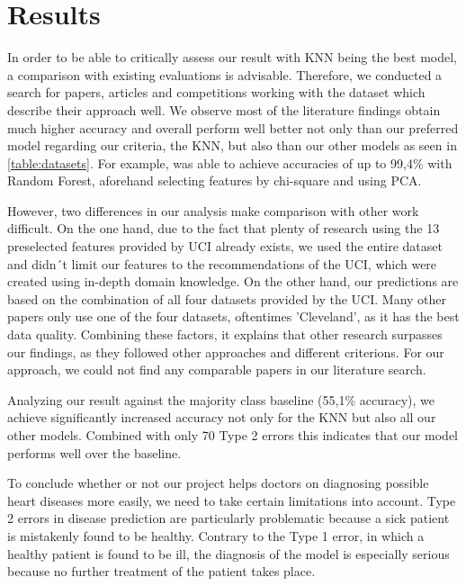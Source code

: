 \section{Results} \label{sec:results}

In order to be able to critically assess our result with KNN being the best model, a comparison with existing evaluations is advisable. Therefore, we conducted a search for papers, articles and competitions working with the dataset which describe their approach well. We observe most of the literature findings obtain much higher accuracy \citep{alotaibi2019, garate-escamila2020, uyar2017} and overall perform well better not only than our preferred model regarding our criteria, the KNN, but also than our other models as seen in \cref{table:datasets}. For example, \citet{garate-escamila2020} was able to achieve accuracies of up to 99,4\% with Random Forest, aforehand selecting features by chi-square and using PCA.  

However, two differences in our analysis make comparison with other work difficult. On the one hand, due to the fact that plenty of research using the 13 preselected features provided by UCI already exists, we used the entire dataset and didn´t limit our features to the recommendations of the UCI, which were created using in-depth domain knowledge. On the other hand, our predictions are based on the combination of all four datasets provided by the UCI. Many other papers only use one of the four datasets, oftentimes 'Cleveland', as it has the best data quality. Combining these factors, it explains that other research surpasses our findings, as they followed other approaches and different criterions. For our approach, we could not find any comparable papers in our literature search. 

Analyzing our result against the majority class baseline (55,1\% accuracy), we achieve significantly increased accuracy not only for the KNN but also all our other models. Combined with only 70 Type 2 errors this indicates that our model performs well over the baseline. 

To conclude whether or not our project helps doctors on diagnosing possible heart diseases more easily, we need to take certain limitations into account. Type 2 errors in disease prediction are particularly problematic because a sick patient is mistakenly found to be healthy. Contrary to the Type 1 error, in which a healthy patient is found to be ill, the diagnosis of the model is especially serious because no further treatment of the patient takes place.  


